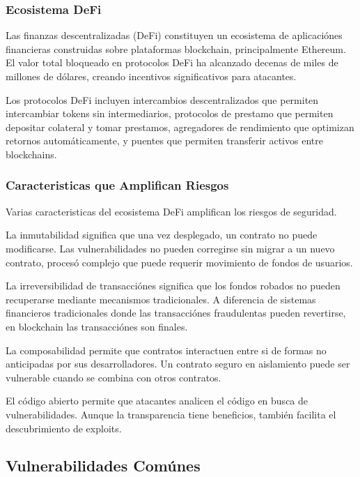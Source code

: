 \documentclass[12pt,a4paper,twoside]{book}
\begin{document}
\subsubsection{Ecosistema DeFi}

Las finanzas descentralizadas (DeFi) constituyen un ecosistema de aplicaciónes financieras construidas sobre plataformas blockchain, principalmente Ethereum. El valor total bloqueado en protocolos DeFi ha alcanzado decenas de miles de millones de dólares, creando incentivos significativos para atacantes.

Los protocolos DeFi incluyen intercambios descentralizados que permiten intercambiar tokens sin intermediarios, protocolos de prestamo que permiten depositar colateral y tomar prestamos, agregadores de rendimiento que optimizan retornos automáticamente, y puentes que permiten transferir activos entre blockchains.

\subsubsection{Caracteristicas que Amplifican Riesgos}

Varias caracteristicas del ecosistema DeFi amplifican los riesgos de seguridad.

La inmutabilidad significa que una vez desplegado, un contrato no puede modificarse. Las vulnerabilidades no pueden corregirse sin migrar a un nuevo contrato, procesó complejo que puede requerir movimiento de fondos de usuarios.

La irreversibilidad de transacciónes significa que los fondos robados no pueden recuperarse mediante mecanismos tradicionales. A diferencia de sistemas financieros tradicionales donde las transacciónes fraudulentas pueden revertirse, en blockchain las transacciónes son finales.

La composabilidad permite que contratos interactuen entre si de formas no anticipadas por sus desarrolladores. Un contrato seguro en aislamiento puede ser vulnerable cuando se combina con otros contratos.

El código abierto permite que atacantes analicen el código en busca de vulnerabilidades. Aunque la transparencia tiene beneficios, también facilita el descubrimiento de exploits.

\subsection{Vulnerabilidades Comúnes}
\end{document}
